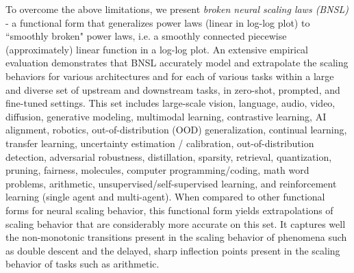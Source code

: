 \documentclass{article} %
\begin{document}
To overcome the above limitations,  we present {\it broken neural scaling laws (BNSL)} - a functional form that generalizes power laws (linear in  log-log plot) %
to ``smoothly broken" power laws, i.e. a smoothly connected piecewise (approximately) linear function in a log-log plot.  An extensive empirical evaluation demonstrates that BNSL accurately model and extrapolate the scaling behaviors for various architectures and for each of various tasks within a large and diverse set of upstream and downstream tasks, in zero-shot, prompted, and fine-tuned settings. This set includes large-scale vision, language, audio, video, diffusion, generative modeling, multimodal learning, contrastive learning, AI alignment, robotics, out-of-distribution (OOD) generalization, continual learning, transfer learning, uncertainty estimation / calibration, out-of-distribution detection, adversarial robustness, distillation, sparsity, retrieval, quantization, pruning, fairness, molecules, computer programming/coding, math word problems, arithmetic, unsupervised/self-supervised learning, and reinforcement learning (single agent and multi-agent).
When compared to other functional forms for neural scaling behavior, this functional form yields extrapolations of scaling behavior that are considerably more accurate on this set. It captures well the non-monotonic transitions present in the scaling behavior of phenomena such as double descent and the delayed, sharp inflection points present in the scaling behavior of tasks such as arithmetic.


\end{document}
